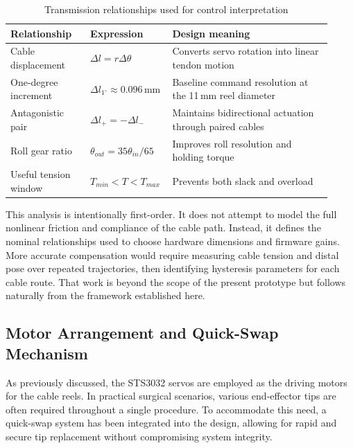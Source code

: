 \begin{table}[htbp]
    \centering
    \caption{Transmission relationships used for control interpretation}
    \label{tab:transmission_relationships}
    \small
    \setlength{\tabcolsep}{4pt}
    \begin{tabular}{@{}p{0.24\linewidth} p{0.20\linewidth} p{0.48\linewidth}@{}}
        \toprule
        Relationship & Expression & Design meaning \\
        \midrule
        Cable displacement & $\Delta l=r\Delta\theta$ & Converts servo rotation into linear tendon motion \\
        One-degree increment & $\Delta l_{1^\circ}\approx0.096\,\mathrm{mm}$ & Baseline command resolution at the 11\,mm reel diameter \\
        Antagonistic pair & $\Delta l_+=-\Delta l_-$ & Maintains bidirectional actuation through paired cables \\
        Roll gear ratio & $\theta_{out}=35\theta_{in}/65$ & Improves roll resolution and holding torque \\
        Useful tension window & $T_{min}<T<T_{max}$ & Prevents both slack and overload \\
        \bottomrule
    \end{tabular}
\end{table}

This analysis is intentionally first-order. It does not attempt to model the full nonlinear friction and compliance of the cable path. Instead, it defines the nominal relationships used to choose hardware dimensions and firmware gains. More accurate compensation would require measuring cable tension and distal pose over repeated trajectories, then identifying hysteresis parameters for each cable route. That work is beyond the scope of the present prototype but follows naturally from the framework established here.

\subsection{Motor Arrangement and Quick-Swap Mechanism}

As previously discussed, the STS3032 servos are employed as the driving motors for the cable reels. In practical surgical scenarios, various end-effector tips are often required throughout a single procedure. To accommodate this need, a quick-swap system has been integrated into the design, allowing for rapid and secure tip replacement without compromising system integrity.

